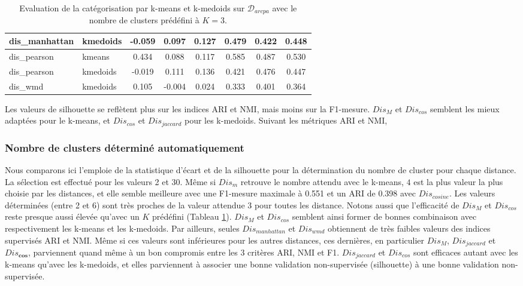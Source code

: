\begin{table}[!htb]
\begin{tabular}[pos]{|l|l|c|c|c|c|c|c|}
		 dis\_manhattan  & kmedoids  & -0.059     & 0.097 & 0.127 & 0.479  & 0.422     & 0.448 \\ \hline
		 dis\_pearson    & kmeans    & 0.434      & 0.088 & 0.117 & 0.585  & 0.487     & 0.530 \\ \hline
		 dis\_pearson    & kmedoids  & -0.019     & 0.111 & 0.136 & 0.421  & 0.476     & 0.447 \\ \hline
		 dis\_wmd    & kmedoids  & 0.105 & -0.004&	0.024&	0.333&	0.401&	0.364 \\ \hline
	\end{tabular}
	\caption{Evaluation de la catégorisation par k-means et k-medoids sur $\mathcal{D}_{arcpa}$ avec le nombre de clusters prédéfini à $K=3$.} \label{tab:similarite:validation-supervisee-k3}
\end{table}

Les valeurs de silhouette se reflètent plus sur les indices ARI et NMI, mais moins sur la F1-mesure. $Dis_M$ et $Dis_{cos}$ semblent les mieux adaptées pour le k-means, et $Dis_{cos}$ et $Dis_{jaccard}$ pour les k-medoids. Suivant les métriques ARI et NMI, 


\subsubsection{Nombre de clusters déterminé automatiquement}
Nous comparons ici l'emploie de la statistique d'écart et de la silhouette pour la détermination du nombre de cluster pour chaque distance. La sélection est effectué pour les valeurs 2 et 30. Même si $Dis_m$ retrouve le nombre attendu avec le k-means, $4$ est la plus valeur la plus choisie par les distances, et elle semble meilleure avec une F1-mesure maximale à 0.551 et un ARI de 0.398 avec $Dis_{cosine}$. Les valeurs déterminées (entre 2 et 6) sont très proches de la valeur attendue 3 pour toutes les distance.  Notons aussi que l'efficacité de $Dis_M$ et $Dis_{cos}$ reste presque aussi élevée qu'avec un $K$ prédéfini (Tableau \ref{tab:similarite:validation-supervisee-k3}). $Dis_M$ et $Dis_{cos}$ semblent ainsi former de bonnes combinaison avec respectivement les k-means et les k-medoids. Par ailleurs, seules $Dis_{manhattan}$ et $Dis_{wmd}$ obtiennent de très faibles valeurs des indices supervisés ARI et NMI. Même si ces valeurs sont inférieures pour les autres distances, ces dernières, en particulier $Dis_M$, $Dis_{jaccard}$ et $Dis_\textbf{cos}$, parviennent quand même à un bon compromis entre les 3 critères ARI, NMI et F1. $Dis_{jaccard}$ et $Dis_{cos}$ sont efficaces autant avec les k-means qu'avec les k-medoids, et elles parviennent à associer une bonne validation non-supervisée (silhouette) à une bonne validation non-supervisée.


